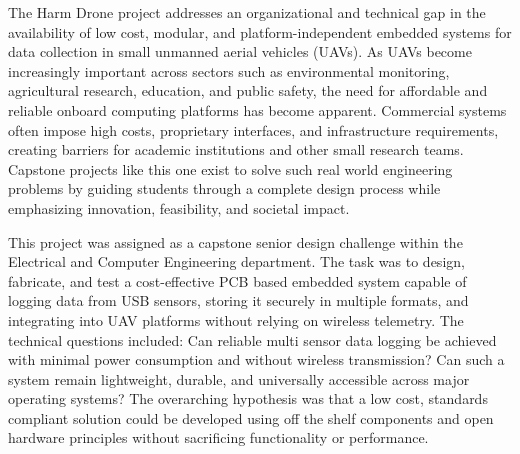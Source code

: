 \documentclass[12pt]{article}
\begin{document}

\par The Harm Drone project addresses an organizational and technical gap in the availability of low cost, modular, and platform-independent embedded systems for data collection in small unmanned aerial vehicles (UAVs). As UAVs become increasingly important across sectors such as environmental monitoring, agricultural research, education, and public safety, the need for affordable and reliable onboard computing platforms has become apparent. Commercial systems often impose high costs, proprietary interfaces, and infrastructure requirements, creating barriers for academic institutions and other small research teams. Capstone projects like this one exist to solve such real world engineering problems by guiding students through a complete design process while emphasizing innovation, feasibility, and societal impact.

\par This project was assigned as a capstone senior design challenge within the Electrical and Computer Engineering department. The task was to design, fabricate, and test a cost-effective PCB based embedded system capable of logging data from USB sensors, storing it securely in multiple formats, and integrating into UAV platforms without relying on wireless telemetry. The technical questions included: Can reliable multi sensor data logging be achieved with minimal power consumption and without wireless transmission? Can such a system remain lightweight, durable, and universally accessible across major operating systems? The overarching hypothesis was that a low cost, standards compliant solution could be developed using off the shelf components and open hardware principles without sacrificing functionality or performance.
\end{document}
